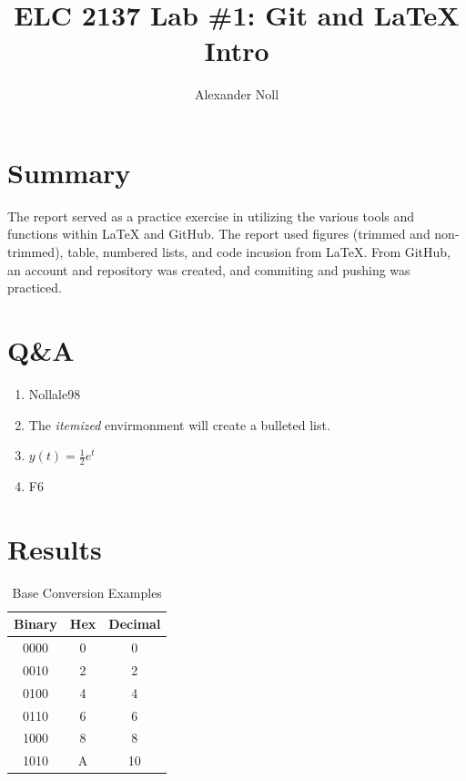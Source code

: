 \documentclass[11pt]{article}
\begin{document}
\title{ELC 2137 Lab \#1: Git and LaTeX Intro}
\author{Alexander Noll}

\maketitle


\section*{Summary}

The report served as a practice exercise in utilizing the various tools and functions within LaTeX and GitHub. The report used figures (trimmed and non-trimmed), table, numbered lists, and code incusion from LaTeX. From GitHub, an account and repository was created, and commiting and pushing was practiced.


\section*{Q\&A}

\begin{enumerate}
	\item Nollale98
	\item The \textit{itemized} envirmonment will create a bulleted list.
	\item $ y(t) = \frac{1}{2} e^t$
	\item F6
\end{enumerate}


\section*{Results}

\begin{table}[ht]\centering\caption{Base Conversion Examples}\label{tbl:example_table}\begin{tabular}{c|c|c}\toprule Binary & Hex & Decimal \\\midrule0000 & 0 & 0 \\0010 & 2 & 2 \\0100 & 4 & 4 \\0110 & 6 & 6 \\1000 & 8 & 8 \\1010 & A & 10 \\\bottomrule\end{tabular} \end{table}
\clearpage
\end{document}

